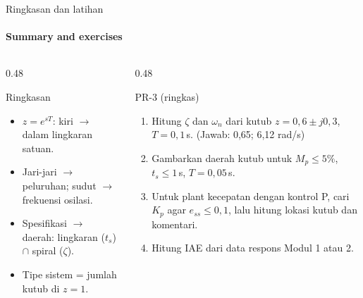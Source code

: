 \documentclass[aspectratio=169,10pt]{beamer}
\begin{document}
\begin{frame}{Ringkasan dan latihan}
	\framesubtitle{Summary and exercises}
	\begin{columns}[T]
		\begin{column}{0.48\textwidth}
			\begin{block}{Ringkasan}
				\small
				\begin{itemize}
					\item $z=e^{sT}$: kiri $\rightarrow$ dalam lingkaran satuan.
					\item Jari-jari $\rightarrow$ peluruhan; sudut $\rightarrow$ frekuensi osilasi.
					\item Spesifikasi $\rightarrow$ daerah: lingkaran ($t_s$) $\cap$ spiral ($\zeta$).
					\item Tipe sistem = jumlah kutub di $z=1$.
				\end{itemize}
			\end{block}
		\end{column}
		\begin{column}{0.48\textwidth}
			\begin{exampleblock}{PR-3 (ringkas)}
				\small
				\begin{enumerate}
					\item Hitung $\zeta$ dan $\omega_n$ dari kutub $z = 0{,}6 \pm j0{,}3$, $T=0{,}1$\,s. (Jawab: 0,65; 6,12 rad/s)
					\item Gambarkan daerah kutub untuk $M_p\le5\%$, $t_s\le1$\,s, $T=0{,}05$\,s.
					\item Untuk plant kecepatan dengan kontrol P, cari $K_p$ agar $e_{ss}\le 0{,}1$, lalu hitung lokasi kutub dan komentari.
					\item Hitung IAE dari data respons Modul 1 atau 2.
				\end{enumerate}
			\end{exampleblock}
		\end{column}
	\end{columns}
\end{frame}
\end{document}
